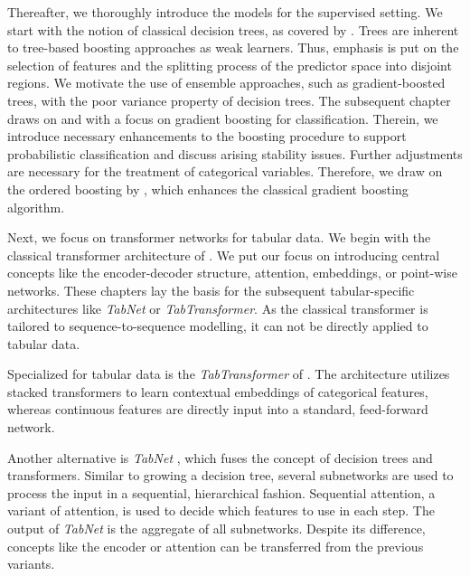 Thereafter, we thoroughly introduce the models for the supervised setting. We start with the notion of classical decision trees, as covered by \textcite{breimanClassificationRegressionTrees2017}. Trees are inherent to tree-based boosting approaches as weak learners. Thus, emphasis is put on the selection of features and the splitting process of the predictor space into disjoint regions. We motivate the use of ensemble approaches, such as gradient-boosted trees, with the poor variance property of decision trees. The subsequent chapter draws on \textcite{hastietrevorElementsStatisticalLearning2009} and \textcite{friedmanGreedyFunctionApproximation2001} with a focus on gradient boosting for classification. Therein, we introduce necessary enhancements to the boosting procedure to support probabilistic classification and discuss arising stability issues. Further adjustments are necessary for the treatment of categorical variables. Therefore, we draw on the ordered boosting by \textcite{prokhorenkovaCatBoostUnbiasedBoosting2018}, which enhances the classical gradient boosting algorithm.

Next, we focus on transformer networks for tabular data. We begin with the classical transformer architecture of \textcite{vaswaniAttentionAllYou2017}. We put our focus on introducing central concepts like the encoder-decoder structure, attention, embeddings, or point-wise networks. These chapters lay the basis for the subsequent tabular-specific architectures like \textit{TabNet} or \textit{TabTransformer}. As the classical transformer is tailored to sequence-to-sequence modelling, it can not be directly applied to tabular data.

Specialized for tabular data is the \textit{TabTransformer} of \textcite{huangTabTransformerTabularData2020}. The architecture utilizes stacked transformers to learn contextual embeddings of categorical features, whereas continuous features are directly input into a standard, feed-forward network.

Another alternative is \textit{TabNet} \autocite{arikTabNetAttentiveInterpretable2020}, which fuses the concept of decision trees and transformers. Similar to growing a decision tree, several subnetworks are used to process the input in a sequential, hierarchical fashion. Sequential attention, a variant of attention, is used to decide which features to use in each step. The output of \textit{TabNet} is the aggregate of all subnetworks. Despite its difference, concepts like the encoder or attention can be transferred from the previous variants. 

